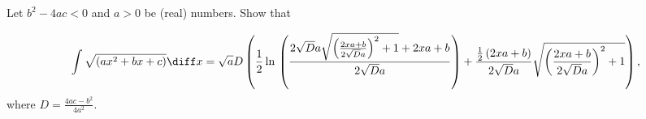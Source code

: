 \label{problemIntegrate sqrt(ax^2+bx+c)dx}
Let $b^2-4ac<0$ and $a>0$ be (real) numbers. Show that 

\[\displaystyle
\int \sqrt{\left(ax^2+bx+c\right)}\diff x = \sqrt{a} D \left(\frac{1}{2} \ln{}\left( \frac{2\sqrt{D} a \sqrt{\left(\frac{2 x a+b}{2 \sqrt{D} a}\right)^{2}+1} +2 x a+b}{2 \sqrt{D} a}\right)+\frac{\frac{1}{2} \left(2 x a+b\right)}{2 \sqrt{D} a} \sqrt{\left(\frac{2 x a+b}{2 \sqrt{D} a}\right)^{2}+1}\right),
\]
where 
$\displaystyle D=\frac{4ac-b^2}{4a^2}$.




